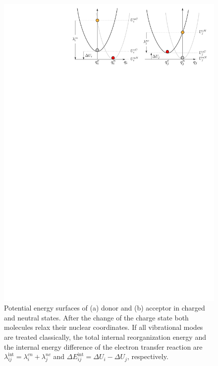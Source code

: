 \begin{figure}
   \centering
   \includegraphics[width=0.6\linewidth]{fig/reorganization_energy/monomer_parabolas}
    \caption{Potential energy surfaces of (a) donor and (b) acceptor in charged and neutral states. After the change of the charge state both molecules relax their nuclear coordinates. If all vibrational modes are treated classically, the total internal reorganization energy and the internal energy difference of the electron transfer reaction are $\lambda_{ij}^\text{int} = \lambda_{i}^{cn} + \lambda_{j}^{nc}$ and $\Delta E_{ij}^\text{int} =  \Delta U_i - \Delta U_j$, respectively.}
   \label{fig:parabolas}
\end{figure}


